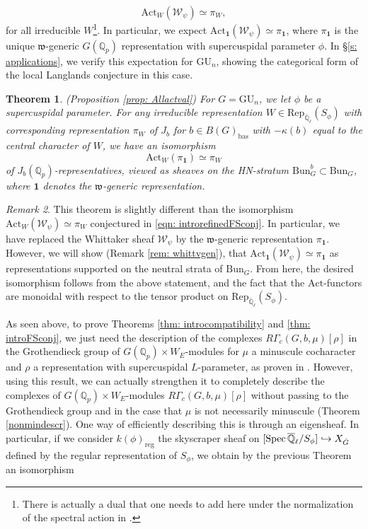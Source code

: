 \documentclass[reqno,11pt]{amsart}
\newtheorem{theorem}{Theorem}[section]
\theoremstyle{remark}
\newtheorem{remark}[theorem]{Remark}
\def\Spec{\mathop{\rm Spec}}
\newcommand{\GU}{\mathrm{GU}}
\newcommand{\mf}{\mathfrak}
\newcommand{\bas}{\mathrm{bas}}
\newcommand{\Act}{\mathrm{Act}}
\newcommand{\Bun}{\mathrm{Bun}}
\newcommand{\Rep}{\mathrm{Rep}}
\def\ol{\overline}
\begin{document}
\[ \Act_{W}(\mathcal{W}_{\psi}) \simeq \pi_{W}, \]
for all irreducible $W$\footnote{There is actually a dual that one needs to add here under the normalization of the spectral action in \cite{FS}.}. In particular, we expect $\Act_{\mathbf{1}}(\mathcal{W}_{\psi}) \simeq \pi_{\mathbf{1}}$, where $\pi_{\mathbf{1}}$ is the unique $\mf{w}$-generic $G(\mathbb{Q}_{p})$ representation with supercuspidal parameter $\phi$. In \S \ref{s: applications}, we verify this expectation for $\GU_{n}$, showing the categorical form of the local Langlands conjecture in this case. 
\begin{theorem}{(Proposition \ref{prop: Allactval})}{\label{thm: introFSconj}}
For $G = \GU_{n}$, we let $\phi$ be a supercuspidal parameter. For any irreducible representation $W \in \Rep_{\ol{\mathbb{Q}}_{\ell}}(S_{\phi})$ with corresponding representation $\pi_{W}$ of $J_{b}$ for $b \in B(G)_{\bas}$ with $-\kappa(b)$ equal to the central character of $W$, we have an isomorphism 
\[ \Act_{W}(\pi_{\mathbf{1}}) \simeq \pi_{W} \]
of $J_{b}(\mathbb{Q}_{p})$-representatives, viewed as sheaves on the HN-stratum $\Bun_{G}^{b} \subset \Bun_{G}$, where $\mathbf{1}$ denotes the $\mf{w}$-generic representation. 
\end{theorem}
\begin{remark}
This theorem is slightly different than the isomorphism $\Act_{W}(\mathcal{W}_{\psi}) \simeq \pi_{W}$ conjectured in \eqref{eqn: introrefinedFSconj}. In particular, we have replaced the Whittaker sheaf $\mathcal{W}_{\psi}$ by the $\mf{w}$-generic representation $\pi_{\mathbf{1}}$.  However, we will show (Remark \ref{rem: whittvgen}), that $\Act_{\mathbf{1}}(\mathcal{W}_{\psi}) \simeq \pi_{\mathbf{1}}$ as representations supported on the neutral strata of $\Bun_{G}$. From here, the desired isomorphism follows from the above statement, and the fact that the $\Act$-functors are monoidal with respect to the tensor product on $\Rep_{\ol{\mathbb{Q}}_{\ell}}(S_{\phi})$. 
\end{remark}
As seen above, to prove Theorems \ref{thm: introcompatibility} and \ref{thm: introFSconj}, we just need the description of the complexes $R\Gamma_{c}(G,b,\mu)[\rho]$ in the Grothendieck group of $G(\mathbb{Q}_{p}) \times W_{E}$-modules for $\mu$ a minuscule cocharacter and $\rho$ a representation with supercuspidal $L$-parameter, as proven in \cite{BMN}. However, using this result, we can actually strengthen it to completely describe the complexes of $G(\mathbb{Q}_{p}) \times W_{E}$-modules $R\Gamma_{c}(G,b,\mu)[\rho]$ without passing to the Grothendieck group and in the case that $\mu$ is not necessarily minuscule (Theorem \ref{nonmindescr}). One way of efficiently describing this is through an eigensheaf. In particular, if we consider $k(\phi)_{\mathrm{reg}}$ the skyscraper sheaf on $[\Spec{\ol{\mathbb{Q}}_{\ell}}/S_{\phi}] \hookrightarrow X_{\hat{G}}$ defined by the regular representation of $S_{\phi}$, we obtain by the previous Theorem an isomorphism
\end{document}
